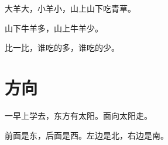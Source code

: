 \documentclass[12pt,UTF-8,openany]{ctexbook}
\begin{document}
\begin{large}
    
    大羊大，小羊小，山上山下吃青草。
    
    山下牛羊多，山上牛羊少。
    
    比一比，谁吃的多，谁吃的少。
    
\end{large}


\clearpage

\begin{center}
    
\end{center}


\hanzibox{}\hanzibox{}\hanzibox{}\hanzibox{}\hspace{1em}\hanzibox{}\hanzibox{}\hanzibox{}\hanzibox{}

\hanzibox{}\hanzibox{}\hanzibox{}\hanzibox{}\hspace{1em}\hanzibox{}\hanzibox{}\hanzibox{}\hanzibox{}

\hanzibox{}\hanzibox{}\hanzibox{}\hanzibox{}\hspace{1em}\hanzibox{}\hanzibox{}\hanzibox{}\hanzibox{}






\chapter{方向}

\begin{large}
    
    一早上学去，东方有太阳。面向太阳走。
    
    前面是东，后面是西。左边是北，右边是南。
    
\end{large}


\clearpage

\begin{center}
    
    
\end{center}


\hanzibox{}\hanzibox{}\hanzibox{}\hanzibox{}\hspace{1em}\hanzibox{}\hanzibox{}\hanzibox{}\hanzibox{}
\end{document}
